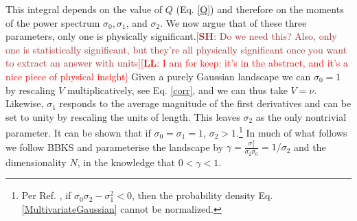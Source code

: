 \documentclass[12pt]{article}
\newcommand{\re}[1]{\textcolor{blue}{[{\bf RE}: #1]}}
\newcommand{\lfl}[1]{\textcolor{red}{[{\bf LL}: #1]}}
\newcommand{\SH}[1]{\textcolor{brown}{[{\bf SH}: #1]}}
\begin{document}
This integral depends on the value of $Q$ (Eq. \ref{Q})  and therefore on the moments of the power spectrum $\sigma_0, \sigma_1$,  and $\sigma_2$. We now argue that of these three parameters, only one is physically significant.\SH{Do we need this? Also, only one is statistically significant, but they're all physically significant once you want to extract an answer with units}\lfl{I am for keep: it's in the abstract, and it's a nice piece of physical insight} Given a purely Gaussian landscape we can $\sigma_0=1$ by rescaling $V$ multiplicatively, see Eq. \ref{corr}, and we can thus take $V = \nu$. Likewise, $\sigma_1$ responds to the average magnitude of the first derivatives and can be set to unity by rescaling the units of length. This leaves $\sigma_2$ as the only nontrivial parameter. It can be shown that if $\sigma_0=\sigma_1=1$, $\sigma_2>1$.\footnote{Per Ref. \cite{Yamada2018}, if $\sigma_0\sigma_2 - \sigma_1^2 < 0$, then the probability density Eq. \ref{MultivariateGaussian} cannot be normalized.} In much of what follows we follow BBKS and parameterise the landscape by $\gamma = \frac{\sigma_1^2}{\sigma_2 \sigma_0}=1/\sigma_2$ and the dimensionality $N$,  in the knowledge that $0<\gamma<1$.



\end{document}
